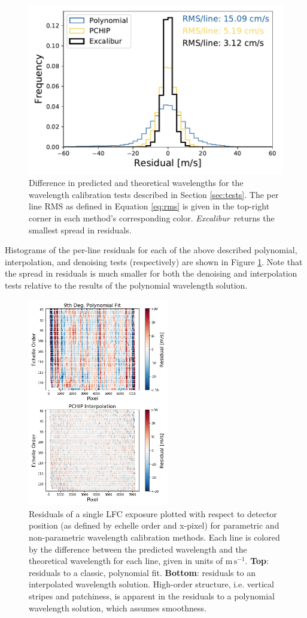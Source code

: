 \documentclass[modern]{aastex63}
\newcommand{\project}[1]{\textsl{#1}}
\newcommand{\Name}{\project{Excalibur}}
\newcommand{\mps}{\mathrm{m\,s^{-1}}}
\begin{document}
\begin{figure}[t]
\centering
\includegraphics[width=.6\textwidth]{Figures/all_results.pdf}
\caption{Difference in predicted and theoretical wavelengths for the wavelength calibration tests described in Section \ref{sec:tests}.  The per line RMS as defined in Equation \ref{eq:rms} is given in the top-right corner in each method's corresponding color.  \Name\ returns the smallest spread in residuals.}
\label{fig:testHists}
\end{figure} 

Histograms of the per-line residuals for each of the above described polynomial, interpolation, and denoising tests (respectively) are shown in Figure \ref{fig:testHists}.  Note that the spread in residuals is much smaller for both the denoising and interpolation tests relative to the results of the polynomial wavelength solution.

\begin{figure}[t]
\centering
\includegraphics[width=0.55\textwidth]{Figures/lineResids2D_col.png}
\caption{Residuals of a single LFC exposure plotted with respect to detector position (as defined by echelle order and x-pixel) for parametric and non-parametric wavelength calibration methods.  Each line is colored by the difference between the predicted wavelength and the theoretical wavelength for each line, given in units of $\mps$.  \textbf{Top}: residuals to a classic, polynomial fit.  \textbf{Bottom}: residuals to an interpolated wavelength solution.  High-order structure, i.e. vertical stripes and patchiness, is apparent in the residuals to a polynomial wavelength solution, which assumes smoothness.}
\label{fig:resid2d}
\end{figure}
\end{document}
